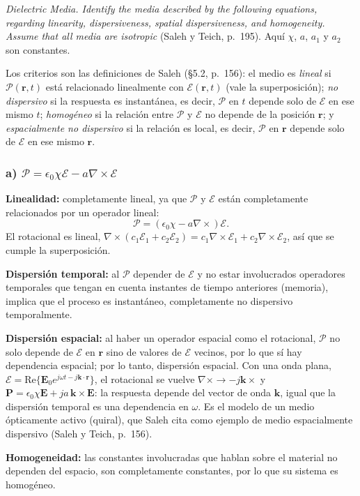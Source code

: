 \documentclass{article}
\newcommand{\Ec}{\boldsymbol{\mathcal{E}}}
\newcommand{\Pc}{\boldsymbol{\mathcal{P}}}
\begin{document}
\emph{Dielectric Media. Identify the media described by the following equations, regarding linearity,
dispersiveness, spatial dispersiveness, and homogeneity. Assume that all media are isotropic}
(Saleh y Teich, p.~195). Aquí $\chi$, $a$, $a_1$ y $a_2$ son constantes.

Los criterios son las definiciones de Saleh (§5.2, p.~156): el medio es \emph{lineal} si
$\Pc(\mathbf r,t)$ está relacionado linealmente con $\Ec(\mathbf r,t)$ (vale la superposición);
\emph{no dispersivo} si la respuesta es instantánea, es decir, $\Pc$ en $t$ depende solo de $\Ec$ en ese
mismo $t$; \emph{homogéneo} si la relación entre $\Pc$ y $\Ec$ no depende de la posición $\mathbf r$; y
\emph{espacialmente no dispersivo} si la relación es local, es decir, $\Pc$ en $\mathbf r$ depende solo de
$\Ec$ en ese mismo $\mathbf r$.

\subsubsection*{a) $\Pc=\epsilon_0\chi\Ec-a\nabla\times\Ec$}

\textbf{Linealidad:} completamente lineal, ya que $\Pc$ y $\Ec$ están completamente relacionados por un
operador lineal:
\[
\Pc=\left(\epsilon_0\chi-a\nabla\times\right)\Ec .
\]
El rotacional es lineal, $\nabla\times(c_1\Ec_1+c_2\Ec_2)=c_1\nabla\times\Ec_1+c_2\nabla\times\Ec_2$,
así que se cumple la superposición.

\textbf{Dispersión temporal:} al $\Pc$ depender de $\Ec$ y no estar involucrados operadores temporales
que tengan en cuenta instantes de tiempo anteriores (memoria), implica que el proceso es instantáneo,
completamente no dispersivo temporalmente.

\textbf{Dispersión espacial:} al haber un operador espacial como el rotacional, $\Pc$ no solo depende de
$\Ec$ en $\mathbf r$ sino de valores de $\Ec$ vecinos, por lo que sí hay dependencia espacial; por lo
tanto, dispersión espacial. Con una onda plana, $\Ec=\mathrm{Re}\{\mathbf E_0e^{j\omega t-j\mathbf k\cdot\mathbf r}\}$,
el rotacional se vuelve $\nabla\times\to-j\mathbf k\times$ y
$\mathbf P=\epsilon_0\chi\mathbf E+ja\,\mathbf k\times\mathbf E$: la respuesta depende del vector de onda
$\mathbf k$, igual que la dispersión temporal es una dependencia en $\omega$. Es el modelo de un medio
ópticamente activo (quiral), que Saleh cita como ejemplo de medio espacialmente dispersivo
(Saleh y Teich, p.~156).

\textbf{Homogeneidad:} las constantes involucradas que hablan sobre el material no dependen del
espacio, son completamente constantes, por lo que su sistema es homogéneo.
\end{document}

